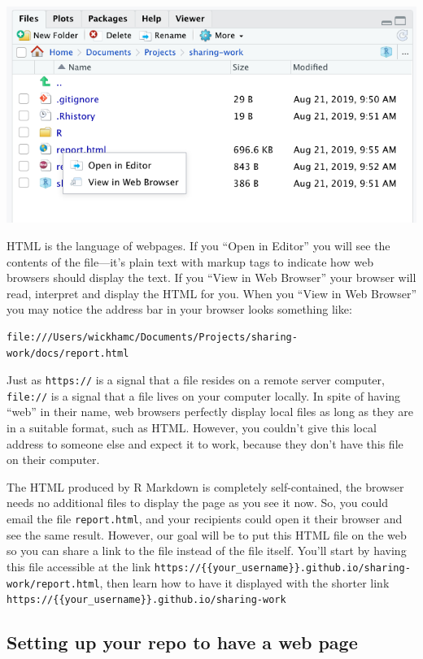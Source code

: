 \documentclass[]{Nemilov}
\begin{document}
\includegraphics{figures/r-publishing/open-html.png}

HTML is the language of webpages. If you ``Open in Editor'' you will see the contents of the file---it's plain text with markup tags
to indicate how web browsers should display the text. If you ``View in Web Browser'' your browser will read, interpret and display the HTML for you. When you ``View in Web Browser'' you may notice the address bar in your browser looks something like:

\begin{verbatim}
file:///Users/wickhamc/Documents/Projects/sharing-work/docs/report.html
\end{verbatim}

Just as \texttt{https://} is a signal that a file resides on a remote server computer, \texttt{file://} is a signal that a file lives on your computer locally. In spite of having ``web'' in their name, web browsers perfectly display local files as long as they are in a suitable format,
such as HTML. However, you couldn't give this local address to someone else and expect it to work, because they don't have this file on their computer.

The HTML produced by R Markdown is completely self-contained, the browser needs no additional files to display the page as you see it now. So, you could email the file \texttt{report.html}, and your recipients could open it their browser and see the same result. However, our goal will be to put this HTML file on the web so you can share a link to the file instead of the file itself. You'll start by having this file accessible at the link \texttt{https://\{\{your\_username\}\}.github.io/sharing-work/report.html}, then learn how to have it displayed with the shorter link \texttt{https://\{\{your\_username\}\}.github.io/sharing-work}

\hypertarget{setting-up-your-repo-to-have-a-web-page}{%
\subsection{Setting up your repo to have a web page}\label{setting-up-your-repo-to-have-a-web-page}}
\end{document}
